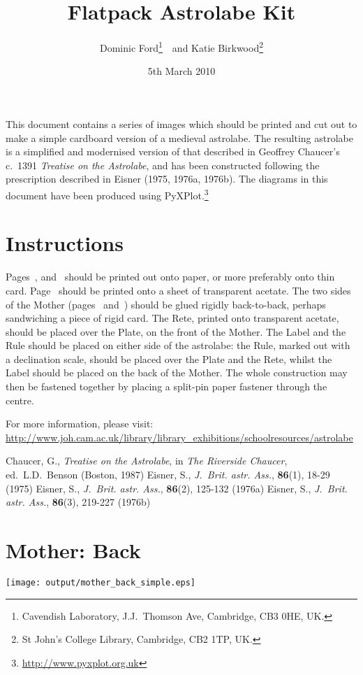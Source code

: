 \documentclass[a4paper,onecolumn,10pt]{article}
\title{\vspace{-3cm}Flatpack Astrolabe Kit}
\author{Dominic Ford\footnote{Cavendish Laboratory, J.J.\ Thomson Ave, Cambridge, CB3 0HE, UK.}~~and Katie Birkwood\footnote{St John's College Library, Cambridge, CB2 1TP, UK.}}
\date{5th March 2010}
\begin{document}
\maketitle
\setcounter{footnote}{3}

This document contains a series of images which should be printed and cut out
to make a simple cardboard version of a medieval astrolabe. The resulting
astrolabe is a simplified and modernised version of that described in Geoffrey
Chaucer's c.\ 1391 {\it Treatise on the Astrolabe}, and has been constructed
following the prescription described in Eisner (1975, 1976a, 1976b). The
diagrams in this document have been produced using
PyXPlot.\footnote{\url{http://www.pyxplot.org.uk}}

\section*{Instructions}

Pages~\pageref{mother_back}, \pageref{mother_front} and~\pageref{rule} should
be printed out onto paper, or more preferably onto thin card.
Page~\pageref{rete} should be printed onto a sheet of transparent acetate. The
two sides of the Mother (pages~\pageref{mother_back}
and~\pageref{mother_front}) should be glued rigidly back-to-back, perhaps
sandwiching a piece of rigid card.  The Rete, printed onto transparent acetate,
should be placed over the Plate, on the front of the Mother.  The Label and the
Rule should be placed on either side of the astrolabe: the Rule, marked out
with a declination scale, should be placed over the Plate and the Rete, whilst
the Label should be placed on the back of the Mother. The whole construction
may then be fastened together by placing a split-pin paper fastener through the
centre.

For more information, please visit: \url{http://www.joh.cam.ac.uk/library/library_exhibitions/schoolresources/astrolabe}

\begin{thebibliography}{9}
Chaucer, G., \textit{Treatise on the Astrolabe}, in {\it The Riverside Chaucer}, ed.\ L.D.\ Benson (Boston, 1987)
Eisner, S., \textit{J.\ Brit. astr. Ass.}, \textbf{86}(1), 18-29 (1975)
Eisner, S., \textit{J.\ Brit. astr. Ass.}, \textbf{86}(2), 125-132 (1976a)
Eisner, S., \textit{J.\ Brit. astr. Ass.}, \textbf{86}(3), 219-227 (1976b)
\end{thebibliography}

\newpage
\section*{Mother: Back}
\label{mother_back}
\vspace{-1cm}\centerline{\texttt{[image: output/mother\_back\_simple.eps]}}
\end{document}
